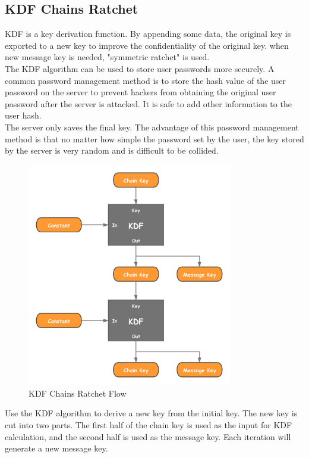 \documentclass[11pt]{article}
\begin{document}
\subsection{KDF Chains Ratchet}

KDF is a key derivation function. By appending some data, the original key is exported to a new key to improve the confidentiality of the original key. when new message key is needed, "symmetric ratchet" is used.\\
The KDF algorithm can be used to store user passwords more securely. A common password management method is to store the hash value of the user password on the server to prevent hackers from obtaining the original user password after the server is attacked. It is safe to add other information to the user hash.\\
The server only saves the final key. 
The advantage of this password management method is that no matter how simple the password set by the user, the key stored by the server is very random and is difficult to be collided.

\begin{figure}[H]
    \centering
    \includegraphics[width=0.8\textwidth]{Fig3} 
    \caption{KDF Chains Ratchet Flow}
\end{figure}


Use the KDF algorithm to derive a new key from the initial key. The new key is cut into two parts. The first half of the chain key is used as the input for KDF calculation, and the second half is used as the message key. 
Each iteration will generate a new message key.
\end{document}
